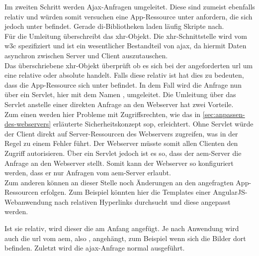 \label{sec:ajax-anfragen-anpassen}

Im zweiten Schritt werden Ajax-Anfragen umgeleitet. Diese sind zumeist ebenfalls relativ und würden somit versuchen eine App-Ressource unter \serverA anfordern, die sich jedoch unter \serverB befindet. Gerade \ac{di}-Bibliotheken laden läufig Skripte nach. \\
Für die Umleitung überschreibt  das \ac{xhr}-Objekt. Die \ac{xhr}-Schnittstelle wird vom \ac{w3c} spezifiziert und ist ein wesentlicher Bestandteil von \ac{ajax}, da hiermit Daten asynchron zwischen Server und Client auszutauschen. \\
Das überschriebene \ac{xhr}-Objekt überprüft ob es sich bei der angeforderten \ac{url} um eine relative oder absolute handelt. Falls diese relativ ist hat dies zu bedeuten, dass die App-Ressource sich unter \serverB befindet. In dem Fall wird die Anfrage nun über ein Servlet, hier mit dem Namen , umgeleitet. Die Umleitung über das Servlet anstelle einer direkten Anfrage an den Webserver hat zwei Vorteile. \\
Zum einen werden hier Probleme mit Zugriffsrechten, wie das in \autoref{sec:anpassen-des-webservers} erläuterte Sicherheitskonzept \ac{sop}, erleichtert. Ohne Servlet würde der Client direkt auf Server-Ressourcen des Webservers zugreifen, was in der Regel zu einem Fehler führt. Der Webserver müsste somit allen Clienten den Zugriff autorisieren. Über ein Servlet jedoch ist es so, dass der \ac{aem}-Server die Anfrage an den Webserver stellt. Somit kann der Webserver so konfiguriert werden, dass er nur Anfragen vom \ac{aem}-Server erlaubt.
\\
Zum anderen können an dieser Stelle noch Änderungen an den angefragten App-Ressourcen erfolgen. Zum Beispiel könnten hier die Templates einer AngularJS-Webanwendung nach relativen Hyperlinks durchsucht und diese angepasst werden.



Ist sie relativ, wird dieser die \serverB am Anfang angefügt. Je nach Anwendung wird auch die \ac{url} vom \ac{aem}, also \serverA, angehängt, zum Beispiel wenn sich die Bilder dort befinden.  Zuletzt wird die \ac{ajax}-Anfrage normal ausgeführt.
